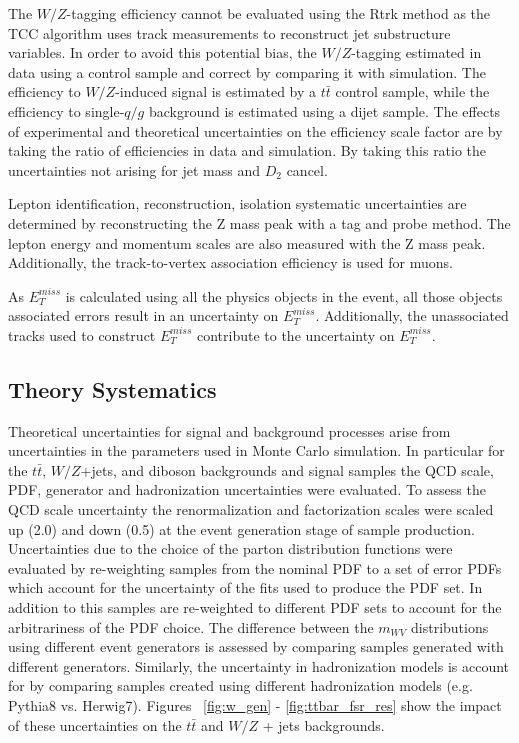 The $W/Z$-tagging efficiency cannot be evaluated using the Rtrk method as the TCC algorithm uses track measurements to reconstruct jet substructure variables. In order to avoid this potential bias, the $W/Z$-tagging estimated in data using a control sample and correct by comparing it with simulation. The efficiency to $W/Z$-induced signal is estimated by a $t\bar{t}$ control sample, while the efficiency to single-$q/g$ background is estimated using a dijet sample. The effects of experimental and theoretical uncertainties on the efficiency scale factor are by taking the ratio of efficiencies in data and simulation. By taking this ratio the uncertainties not arising for jet mass and $D_{2}$ cancel. 

Lepton identification, reconstruction, isolation systematic uncertainties are determined by reconstructing the Z mass peak with a tag and probe method. The lepton energy and momentum scales are also measured with the Z mass peak. Additionally, the track-to-vertex association efficiency is used for muons.

As $E_{T}^{miss}$ is calculated using all the physics objects in the event, all those objects associated errors result in an uncertainty on $E_{T}^{miss}$. Additionally, the unassociated tracks used to construct $E_{T}^{miss}$ contribute to the uncertainty on $E_{T}^{miss}$. 


\subsection{Theory Systematics}
Theoretical uncertainties for signal and background processes arise from uncertainties in the parameters used in Monte Carlo simulation. In particular for the $t\bar{t}$, $W/Z$+jets, and diboson backgrounds and signal samples the QCD scale, PDF, generator and hadronization uncertainties were evaluated. To assess the QCD scale uncertainty the renormalization and factorization scales were scaled up (2.0) and down (0.5) at the event generation stage of sample production. Uncertainties due to the choice of the parton distribution functions were evaluated by re-weighting samples from the nominal PDF to a set of error PDFs which account for the uncertainty of the fits used to produce the PDF set. In addition to this samples are re-weighted to different PDF sets to account for the arbitrariness of the PDF choice. The difference between the $m_{WV}$ distributions using different event generators is assessed by comparing samples generated with different generators. Similarly, the uncertainty in hadronization models is account for by comparing samples created using different hadronization models (e.g. Pythia8 vs. Herwig7). Figures ~\ref{fig:w_gen} - \ref{fig:ttbar_fsr_res} show the impact of these uncertainties on the $t\bar{t}$ and $W/Z$ + jets backgrounds.

